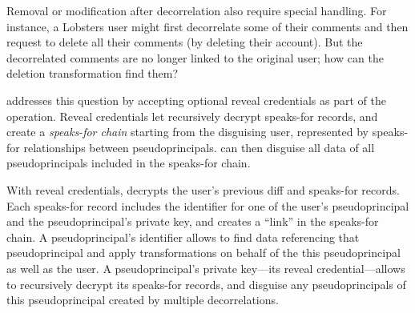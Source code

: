 %
%

Removal or modification after decorrelation also require special handling. For
instance, a Lobsters user might first decorrelate some of their comments and
then request to delete all their comments (\eg by deleting their account).
%
But the decorrelated comments are no
longer linked to the original user; how can the deletion transformation find
them?
%

%
\sys addresses this question by accepting optional reveal credentials as part of
the \xx operation.
%
Reveal credentials let \sys recursively decrypt speaks-for records, and
create a \emph{speaks-for chain} starting from the disguising user, represented
by speaks-for relationships between pseudoprincipals. \sys can then disguise all
data of all pseudoprincipals included in the speaks-for chain.
%

With reveal credentials, \sys decrypts the user's previous diff and speaks-for
records. Each speaks-for record includes the identifier for one of the user's
pseudoprincipal and the pseudoprincipal's private key, and creates a ``link'' in
the speaks-for chain. A pseudoprincipal's identifier allows \sys to find data
referencing that pseudoprincipal and apply \xxing transformations on behalf of
the this pseudoprincipal as well as the user. 
%
A pseudoprincipal's private key---its reveal credential---allows \sys to
recursively decrypt its speaks-for records, and disguise any pseudoprincipals of
this pseudoprincipal created by multiple decorrelations.
%


%
%

